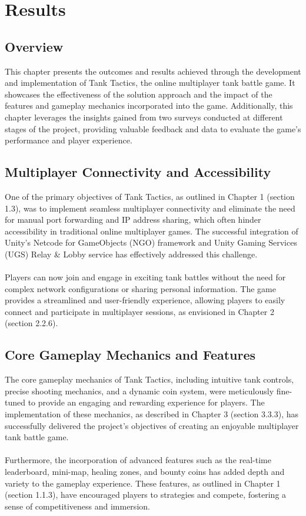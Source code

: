\chapter{Results}
\label{ch:results}

\section{Overview}
This chapter presents the outcomes and results achieved through the development and implementation of Tank Tactics, the online multiplayer tank battle game. It showcases the effectiveness of the solution approach and the impact of the features and gameplay mechanics incorporated into the game. Additionally, this chapter leverages the insights gained from two surveys conducted at different stages of the project, providing valuable feedback and data to evaluate the game's performance and player experience.
\section{Multiplayer Connectivity and Accessibility}
One of the primary objectives of Tank Tactics, as outlined in Chapter 1 (section 1.3), was to implement seamless multiplayer connectivity and eliminate the need for manual port forwarding and IP address sharing, which often hinder accessibility in traditional online multiplayer games. The successful integration of Unity's Netcode for GameObjects (NGO) framework and Unity Gaming Services (UGS) Relay \& Lobby service has effectively addressed this challenge.
\\
\noindent
\\
Players can now join and engage in exciting tank battles without the need for complex network configurations or sharing personal information. The game provides a streamlined and user-friendly experience, allowing players to easily connect and participate in multiplayer sessions, as envisioned in Chapter 2 (section 2.2.6).

\section{Core Gameplay Mechanics and Features}
The core gameplay mechanics of Tank Tactics, including intuitive tank controls, precise shooting mechanics, and a dynamic coin system, were meticulously fine-tuned to provide an engaging and rewarding experience for players. The implementation of these mechanics, as described in Chapter 3 (section 3.3.3), has successfully delivered the project's objectives of creating an enjoyable multiplayer tank battle game.
\\
\noindent
\\
Furthermore, the incorporation of advanced features such as the real-time leaderboard, mini-map, healing zones, and bounty coins has added depth and variety to the gameplay experience. These features, as outlined in Chapter 1 (section 1.1.3), have encouraged players to strategies and compete, fostering a sense of competitiveness and immersion.

